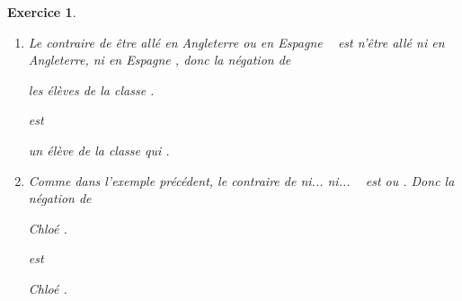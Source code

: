 \documentclass[10pt]{article}
\newtheorem{exo}{Exercice}
\begin{document}
\begin{exo}
\begin{enumerate}
\begin{center}
Dans  \black les pays,  \black un homme qui  \black .
 \end{center}
\item Le contraire de \og être allé en Angleterre ou en Espagne \fg~{} est \og n'être allé ni en Angleterre, ni en Espagne \fg , donc la négation de

\begin{center}

  \black les élèves de la classe  \black .
 
 \end{center}
 
 est
 
 \begin{center}

  \black un élève de la classe qui \black .
 \end{center}
\item Comme dans l'exemple précédent, le contraire de \og ni... ni... \fg~{} est \og ou \fg . Donc la négation de

\begin{center}

 Chloé \black .
 
 \end{center}
 
 est
 
 \begin{center}

 Chloé \black .
 \end{center}

\end{enumerate}



\end{exo}
\end{document}

